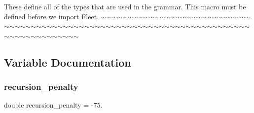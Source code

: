  These define all of the types that are used in the grammar. This macro must be defined before we import \hyperlink{namespace_fleet}{Fleet}. $\sim$$\sim$$\sim$$\sim$$\sim$$\sim$$\sim$$\sim$$\sim$$\sim$$\sim$$\sim$$\sim$$\sim$$\sim$$\sim$$\sim$$\sim$$\sim$$\sim$$\sim$$\sim$$\sim$$\sim$$\sim$$\sim$$\sim$$\sim$$\sim$$\sim$$\sim$$\sim$$\sim$$\sim$$\sim$$\sim$$\sim$$\sim$$\sim$$\sim$$\sim$$\sim$$\sim$$\sim$$\sim$$\sim$$\sim$$\sim$$\sim$$\sim$$\sim$$\sim$$\sim$$\sim$$\sim$$\sim$$\sim$$\sim$$\sim$$\sim$$\sim$$\sim$$\sim$$\sim$$\sim$$\sim$$\sim$$\sim$$\sim$$\sim$$\sim$$\sim$$\sim$$\sim$$\sim$$\sim$$\sim$$\sim$$\sim$$\sim$$\sim$$\sim$$\sim$$\sim$$\sim$$\sim$$\sim$$\sim$ 

\subsection{Variable Documentation}
\mbox{\label{_number-_fancy_2_main_8cpp_a2b89a3942775c189ae481ab8af21076e}} 
\subsubsection{\texorpdfstring{recursion\+\_\+penalty}{recursion\_penalty}}
{\footnotesize\ttfamily double recursion\+\_\+penalty = -\/75.}

